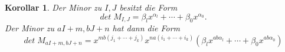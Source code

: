 \documentclass{article}
\newtheorem{korollar}[satz]{Korollar}
\theoremstyle{definition}
\renewcommand{\det}{det\;}
\begin{document}
\begin{korollar}
    Der Minor zu $I,J$ besitzt die Form  
    \begin{equation*}
        \det{} M_{I,J} = \beta_l x^{\alpha_l} + \cdots + \beta_0 x^{\alpha_0}.
    \end{equation*} 
    Der Minor zu $aI + m,bJ + n$ hat dann die Form
    \begin{equation*}
        \det{} M_{aI + m,bJ + n} = x^{mb(j_1+\cdots +j_k)} x^{na(i_1+\cdots +i_k)} \left( \beta_l x^{ab \alpha_l} + \cdots + \beta_0 x^{ab \alpha_0} \right)
    \end{equation*}
\end{korollar}
\end{document}
